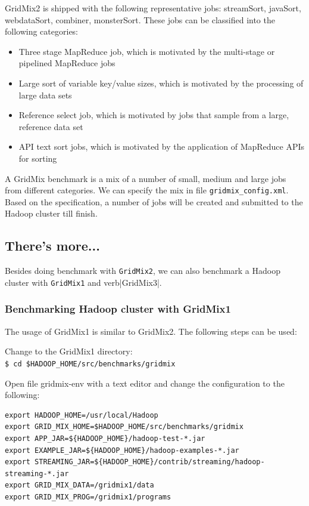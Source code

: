 GridMix2 is shipped with the following representative jobs: streamSort, javaSort, webdataSort, combiner, monsterSort. These jobs can be classified into the following categories:
\begin{itemize}
  \item Three stage MapReduce job, which is motivated by the multi-stage or pipelined MapReduce jobs
  \item Large sort of variable key/value sizes, which is motivated by the processing of large data sets
  \item Reference select job, which is motivated by jobs that sample from a large, reference data set
  \item API text sort jobs, which is motivated by the application of MapReduce APIs for sorting
\end{itemize}
A GridMix benchmark is a mix of a number of small, medium and large jobs from different categories. We can specify the mix in file \verb|gridmix_config.xml|. Based on the specification, a number of jobs will be created and submitted to the Hadoop cluster till finish.
\subsection*{There's more...}
Besides doing benchmark with \verb|GridMix2|, we can also benchmark a Hadoop cluster with \verb|GridMix1| and verb|GridMix3|.

\subsubsection*{Benchmarking Hadoop cluster with GridMix1}
The usage of GridMix1 is similar to GridMix2. The following steps can be used:

Change to the GridMix1 directory: \\
\verb|$ cd $HADOOP_HOME/src/benchmarks/gridmix|

Open file gridmix-env with a text editor and change the configuration to the following:
\lstset{style=bashstyle}
\begin{lstlisting}
export HADOOP_HOME=/usr/local/Hadoop
export GRID_MIX_HOME=$HADOOP_HOME/src/benchmarks/gridmix
export APP_JAR=${HADOOP_HOME}/hadoop-test-*.jar
export EXAMPLE_JAR=${HADOOP_HOME}/hadoop-examples-*.jar
export STREAMING_JAR=${HADOOP_HOME}/contrib/streaming/hadoop-streaming-*.jar
export GRID_MIX_DATA=/gridmix1/data
export GRID_MIX_PROG=/gridmix1/programs
\end{lstlisting}

